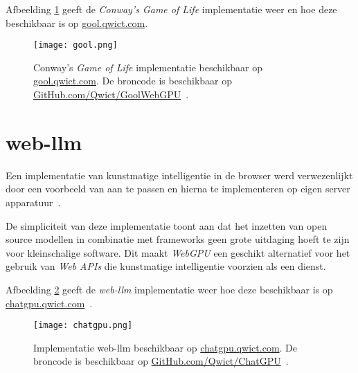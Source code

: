\bigbreak{}

Afbeelding \ref{fig:Conway's Game of Life} geeft de \textit{Conway's Game of Life} implementatie weer en hoe deze beschikbaar is op \href{https://gool.qwict.com}{gool.qwict.com}.

\begin{figure}
    \texttt{[image: gool.png]}
    \caption[Conway's \textit{Game of Life} implementatie~\autocite{google2023, Qwict2024}]{
        Conway's \textit{Game of Life} implementatie beschikbaar op \href{https://gool.qwict.com}{gool.qwict.com}. De broncode is beschikbaar op \href{https://github.com/qwict/GoolWebGPU}{GitHub.com/Qwict/GoolWebGPU}~\autocite{google2023, Qwict2024}.
    }
    \label{fig:Conway's Game of Life}
\end{figure}

\section{web-llm}
\label{sec:chatgpu}

Een implementatie van kunstmatige intelligentie in de browser werd verwezenlijkt door een voorbeeld van \textcite{mlcai2023} aan te passen en hierna te implementeren op eigen server apparatuur~\autocite{Qwict2024a}.

\bigbreak{}

De simpliciteit van deze implementatie toont aan dat het inzetten van open source modellen in combinatie met frameworks geen grote uitdaging hoeft te zijn voor kleinschalige software. Dit maakt \textit{WebGPU} een geschikt alternatief voor het gebruik van \textit{Web APIs} die kunstmatige intelligentie voorzien als een dienst.

\bigbreak{}

Afbeelding \ref{fig:Implementatie web-llm} geeft de \textit{web-llm} implementatie weer hoe deze beschikbaar is op \href{https://chatgpu.qwict.com}{chatgpu.qwict.com}~\autocite{Qwict2024a}.

\begin{figure}
    \texttt{[image: chatgpu.png]}
    \caption[Implementatie web-llm~\autocite{mlcai2023, Qwict2024a}]{
        Implementatie web-llm beschikbaar op \href{https://chatgpu.qwict.com}{chatgpu.qwict.com}. De broncode is beschikbaar op \href{https://github.com/qwict/chatgpu}{GitHub.com/Qwict/ChatGPU}~\autocite{mlcai2023, Qwict2024a}.
    }
    \label{fig:Implementatie web-llm}
\end{figure}